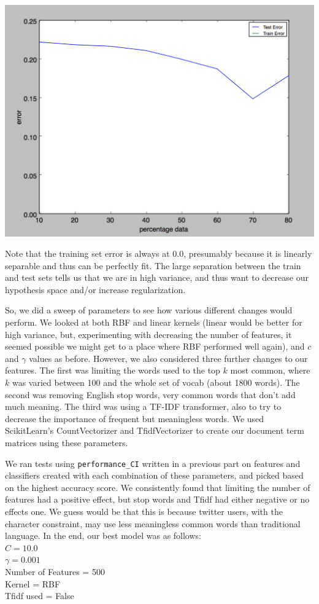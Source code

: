\documentclass[11pt]{article}
\begin{document}
\begin{enumerate}
\includegraphics[scale=0.7]{learningcurve}

Note that the training set error is always at 0.0, presumably because it is linearly separable and thus can be 
perfectly fit. The large separation between the train and test sets tells us that we are in high variance, and 
thus want to decrease our hypothesis space and/or increase regularization.

So, we did a sweep of parameters to see how various different changes would perform. We looked at 
both RBF and linear kernels (linear would be better for high variance, but, experimenting with decreasing the number of features, it seemed possible we might get to a place where RBF performed well again), and $c$
and $\gamma$ values as before. However, we also considered three further changes to our features. The 
first was limiting the words used to the top $k$ most common, where $k$ was varied between 100 and the whole
set of vocab (about 1800 words). The second was removing English stop words, very common words that don't add much meaning. The third was using a TF-IDF transformer, also to try to decrease the importance of frequent but meaningless words. We used ScikitLearn's CountVectorizer and TfidfVectorizer to create our document term matrices using these parameters. 

We ran tests using \texttt{performance\_CI} written in a previous part on features and classifiers created with each combination of these parameters, and picked based on the highest accuracy score. We consistently found that limiting the number of features had a positive effect, but stop words and Tfidf had either negative or no effects one. We guess would be that this is because twitter users, with the character constraint, may use less meaningless common words than traditional language. In the end, our best model was as follows:
\\$C=10.0$
\\$\gamma = 0.001$
\\Number of Features = 500
\\Kernel = RBF
\\ Tfidf used = False


\end{enumerate}
\end{document}
